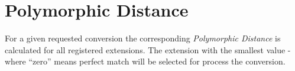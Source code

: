 \section{Polymorphic Distance}
\label{feature:PolymorphicDistance}
For a given requested conversion the corresponding \emph{Polymorphic Distance} is calculated for all registered extensions. The extension with the smallest value - where ``zero'' means perfect match will be selected for process the conversion.
\TODO